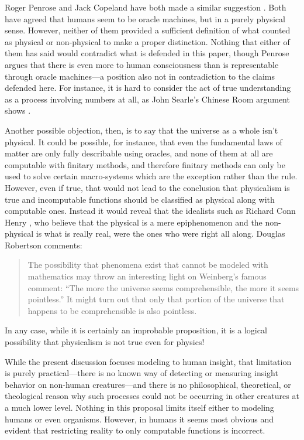 Roger Penrose and Jack Copeland have both made a similar suggestion \citep{copeland1998, hodges2000}.  Both have agreed that humans seem to be oracle machines, but in a purely physical sense.  However, neither of them provided a sufficient definition of what counted as physical or non-physical to make a proper distinction.  Nothing that either of them has said would contradict what is defended in this paper, though Penrose argues that there is even more to human consciousness than is representable through oracle machines---a position also not in contradiction to the claims defended here.   For instance, it is hard to consider the act of true understanding as a process involving numbers at all, as John Searle's Chinese Room argument shows \citep{searle1980}.

Another possible objection, then, is to say that the universe as a whole isn't physical.  It could be possible, for instance, that even the fundamental laws of matter are only fully describable using oracles, and none of them at all are computable with finitary methods, and therefore finitary methods can only be used to solve certain macro-systems which are the exception rather than the rule.  However, even if true, that would not lead to the conclusion that physicalism is true and incomputable functions should be classified as physical along with computable ones.  Instead it would reveal that the idealists such as Richard Conn Henry \citeyearpar{henry2005}, who believe that the physical is a mere epiphenomenon and the non-physical is what is really real, were the ones who were right all along.  Douglas Robertson \citeyearpar{robertson1999} comments:

\begin{quote}
The possibility that phenomena exist that cannot be modeled with mathematics may throw an interesting light on Weinberg's famous comment: ``The more the universe seems comprehensible, the more it seems pointless.'' It might turn out that only that portion of the universe that happens to be comprehensible is also pointless.
\end{quote}

In any case, while it is certainly an improbable proposition, it is a logical possibility that physicalism is not true even for physics!  

While the present discussion focuses modeling to human insight, that limitation is purely practical---there is no known way of detecting or measuring insight behavior on non-human creatures---and there is no philosophical, theoretical, or theological reason why such processes could not be occurring in other creatures at a much lower level.  Nothing in this proposal limits itself either to modeling humans or even organisms.  However, in humans it seems most obvious and evident that restricting reality to only computable functions is incorrect.


